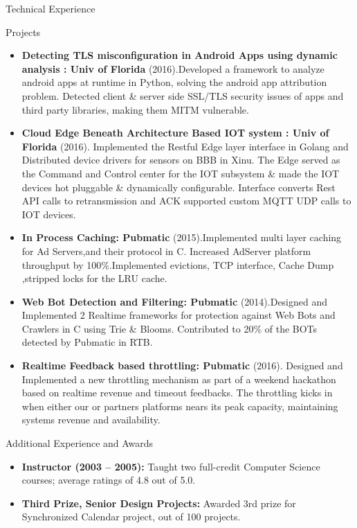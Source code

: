 \documentclass[]{mcdowellcv}
\begin{document}
	\begin{cvsection}{Technical Experience}
		\begin{cvsubsection}{Projects}{}{}
			\begin{itemize}
				\item \textbf{Detecting TLS misconfiguration in Android Apps using dynamic analysis : Univ of Florida} (2016).Developed a framework to analyze android apps at runtime in Python, solving the android app attribution problem. Detected client \& server side SSL/TLS security issues of apps and third party libraries, making them MITM vulnerable.
				\item \textbf{Cloud Edge Beneath Architecture Based IOT system : Univ of Florida} (2016).  Implemented the Restful Edge layer interface in Golang and Distributed device drivers for sensors on BBB in Xinu. The Edge served as the Command and Control center for the IOT subsystem \& made the IOT devices hot pluggable \& dynamically configurable. Interface converts Rest API calls to retransmission and ACK supported custom MQTT UDP calls to IOT devices.
				\item \textbf{In Process Caching: Pubmatic} (2015).Implemented multi layer caching for Ad Servers,and their protocol in C. Increased AdServer platform throughput by 100\%.Implemented evictions, TCP interface, Cache Dump ,stripped locks for the LRU cache.
				
				\item \textbf{Web Bot Detection and Filtering: Pubmatic} (2014).Designed and Implemented 2 Realtime frameworks for protection against Web Bots and Crawlers in C using Trie \& Blooms. Contributed to 20\% of the BOTs detected by Pubmatic in RTB.

				\item \textbf{Realtime Feedback based throttling: Pubmatic} (2016).  Designed and Implemented a new throttling mechanism as part of a weekend hackathon based on realtime revenue and timeout feedbacks. The throttling kicks in when either our or partners platforms nears its peak capacity, maintaining systems revenue and availability.

			\end{itemize}
		\end{cvsubsection}
	\end{cvsection}
	
	\begin{cvsection}{Additional Experience and Awards}
		\begin{cvsubsection}{}{}{}	
			\begin{itemize}
				\item \textbf{Instructor (2003 – 2005):} Taught two full-credit Computer Science courses; average ratings of 4.8 out of 5.0.
				\item \textbf{Third Prize, Senior Design Projects:} Awarded 3rd prize for Synchronized Calendar project, out of 100 projects.
			\end{itemize}
		\end{cvsubsection}
	\end{cvsection}
	
\end{document}
